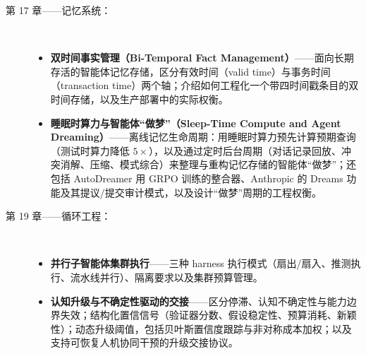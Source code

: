 \documentclass[11pt,a4paper,openany]{book}
\begin{document}
\begin{description}
  \item[第 17 章——记忆系统：]~
    \begin{itemize}
      \item \textbf{双时间事实管理（Bi-Temporal Fact Management）}——面向长期存活的智能体记忆存储，区分有效时间（valid time）与事务时间（transaction time）两个轴；介绍如何工程化一个带四时间戳条目的双时间存储，以及生产部署中的实际权衡。
      \item \textbf{睡眠时算力与智能体“做梦”（Sleep-Time Compute and Agent Dreaming）}——离线记忆生命周期：用睡眠时算力预先计算预期查询（测试时算力降低 $5\times$），以及通过定时后台周期（对话记录回放、冲突消解、压缩、模式综合）来整理与重构记忆存储的智能体“做梦”；还包括 AutoDreamer 用 GRPO 训练的整合器、Anthropic 的 Dreams 功能及其提议/提交审计模式，以及设计“做梦”周期的工程权衡。
    \end{itemize}

  \item[第 19 章——循环工程：]~
    \begin{itemize}
      \item \textbf{并行子智能体集群执行}——三种 harness 执行模式（扇出/扇入、推测执行、流水线并行）、隔离要求以及集群预算管理。
      \item \textbf{认知升级与不确定性驱动的交接}——区分停滞、认知不确定性与能力边界失效；结构化置信信号（验证器分数、假设稳定性、预算消耗、新颖性）；动态升级阈值，包括贝叶斯置信度跟踪与非对称成本加权；以及支持可恢复人机协同干预的升级交接协议。
    \end{itemize}


\end{description}
\end{document}
